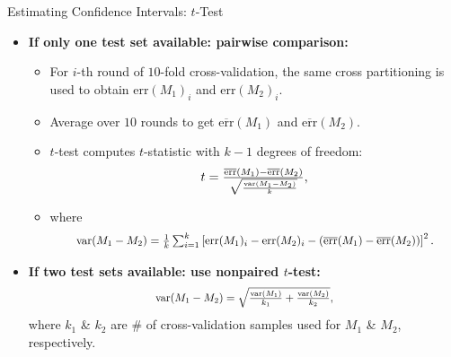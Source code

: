 \begin{frame}{Estimating Confidence Intervals: $t$-Test}
  \begin{itemize}
  \item \textbf{If only one test set available: pairwise comparison:}
    \begin{itemize}
    \item For $i$-th round of $10$-fold cross-validation, the same cross partitioning is used to obtain $\text{err}(M_1)_i$ and $\text{err}(M_2)_i$.
    \item Average over $10$ rounds to get $\overline{\text{err}}(M_1)$ and $\overline{\text{err}}(M_2)$.
    \item $t$-test computes $t$-statistic with $k-1$ degrees of freedom:
      \begin{align}
        \resizebox{3cm}{!}{%
        $t = \frac{\overline{\text{err}}(M_1)- \overline{\text{err}}(M_2)}{\sqrt{\frac{\text{var}(M_1-M_2)}{k}}},$}
      \end{align}
    \item where
      \begin{align}
        \resizebox{10cm}{!}{%
        $\text{var}(M_1-M_2) = \frac{1}{k} \sum_{i=1}^{k} \left[ \text{err}(M_1)_i - \text{err}(M_2)_i - (\overline{\text{err}}(M_1) - \overline{\text{err}}(M_2))\right]^2.$}
      \end{align}
    \end{itemize}
  \item \textbf{If two test sets available: use nonpaired $t$-test:}
    \begin{align}
      \resizebox{5cm}{!}{%
      $\text{var}(M_1-M_2) = \sqrt{\frac{\text{var}(M_1)}{k_1} + \frac{\text{var}(M_2)}{k_2}},$}
    \end{align}
    where $k_1$ \& $k_2$ are $\#$ of cross-validation samples used for $M_1$ \& $M_2$, respectively.
  \end{itemize}
\end{frame}

